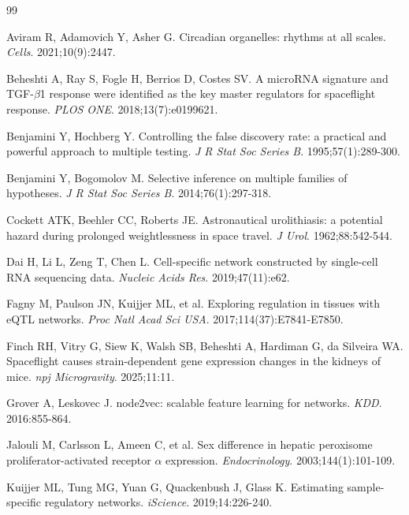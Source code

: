 \documentclass[11pt]{article}
\begin{document}
\begin{thebibliography}{99}\small

 Aviram R, Adamovich Y, Asher G. Circadian organelles: rhythms at all scales. \emph{Cells}. 2021;10(9):2447.

 Beheshti A, Ray S, Fogle H, Berrios D, Costes SV. A microRNA signature and TGF-$\beta$1 response were identified as the key master regulators for spaceflight response. \emph{PLOS ONE}. 2018;13(7):e0199621.

 Benjamini Y, Hochberg Y. Controlling the false discovery rate: a practical and powerful approach to multiple testing. \emph{J R Stat Soc Series B}. 1995;57(1):289-300.

 Benjamini Y, Bogomolov M. Selective inference on multiple families of hypotheses. \emph{J R Stat Soc Series B}. 2014;76(1):297-318.

 Cockett ATK, Beehler CC, Roberts JE. Astronautical urolithiasis: a potential hazard during prolonged weightlessness in space travel. \emph{J Urol}. 1962;88:542-544.

 Dai H, Li L, Zeng T, Chen L. Cell-specific network constructed by single-cell RNA sequencing data. \emph{Nucleic Acids Res}. 2019;47(11):e62.

 Fagny M, Paulson JN, Kuijjer ML, et al. Exploring regulation in tissues with eQTL networks. \emph{Proc Natl Acad Sci USA}. 2017;114(37):E7841-E7850.

 Finch RH, Vitry G, Siew K, Walsh SB, Beheshti A, Hardiman G, da Silveira WA. Spaceflight causes strain-dependent gene expression changes in the kidneys of mice. \emph{npj Microgravity}. 2025;11:11.

 Grover A, Leskovec J. node2vec: scalable feature learning for networks. \emph{KDD}. 2016:855-864.

 Jalouli M, Carlsson L, Ameen C, et al. Sex difference in hepatic peroxisome proliferator-activated receptor $\alpha$ expression. \emph{Endocrinology}. 2003;144(1):101-109.

 Kuijjer ML, Tung MG, Yuan G, Quackenbush J, Glass K. Estimating sample-specific regulatory networks. \emph{iScience}. 2019;14:226-240.


\end{thebibliography}
\end{document}
